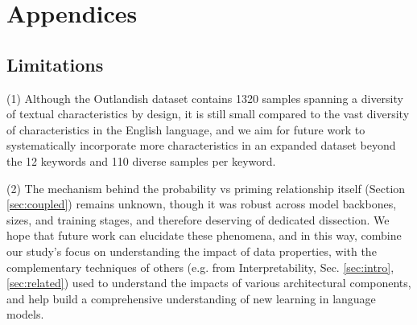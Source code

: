 \documentclass[11pt, a4paper, logo, copyright]{googledeepmind}
\theoremstyle{plain}
\theoremstyle{definition}
\theoremstyle{remark}
\begin{document}








\newpage
\newpage


% 
% 



% 

\newpage
\appendix
\onecolumn
\appendix

\section{Appendices}



\subsection{Limitations} %
\label{sec:limitations}
(1) Although the Outlandish dataset contains 1320 samples spanning a diversity of textual characteristics by design, it is still small compared to the vast diversity of characteristics in the English language, and we aim for future work to systematically incorporate more characteristics in an expanded dataset beyond the 12 keywords and 110 diverse samples per keyword. 

(2) The mechanism behind the probability vs priming relationship itself (Section \ref{sec:coupled}) remains unknown, though it was robust across model backbones, sizes, and training stages, and therefore deserving of dedicated dissection. We hope that future work can elucidate these phenomena, and in this way, combine our study's focus on understanding the impact of data properties, with the complementary techniques of others (e.g. from Interpretability, Sec. \ref{sec:intro}, \ref{sec:related}) used to understand the impacts of various architectural components, and help build a comprehensive understanding of new learning in language models.
\end{document}
